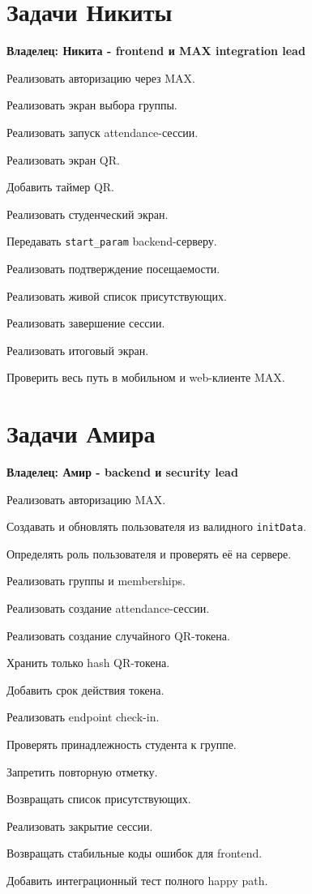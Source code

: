 \documentclass[11pt,a4paper]{article}
\newcommand{\code}[1]{\texttt{#1}}\newcommand{\owner}[1]{\textcolor{MaxPurple}{\textbf{Владелец: #1}}}
\begin{document}
\section{Задачи Никиты}
\owner{Никита - frontend и MAX integration lead}
\begin{tasklist}
  \item Реализовать авторизацию через MAX.
  \item Реализовать экран выбора группы.
  \item Реализовать запуск attendance-сессии.
  \item Реализовать экран QR.
  \item Добавить таймер QR.
  \item Реализовать студенческий экран.
  \item Передавать \code{start\_param} backend-серверу.
  \item Реализовать подтверждение посещаемости.
  \item Реализовать живой список присутствующих.
  \item Реализовать завершение сессии.
  \item Реализовать итоговый экран.
  \item Проверить весь путь в мобильном и web-клиенте MAX.
\end{tasklist}

\section{Задачи Амира}
\owner{Амир - backend и security lead}
\begin{tasklist}
  \item Реализовать авторизацию MAX.
  \item Создавать и обновлять пользователя из валидного \code{initData}.
  \item Определять роль пользователя и проверять её на сервере.
  \item Реализовать группы и memberships.
  \item Реализовать создание attendance-сессии.
  \item Реализовать создание случайного QR-токена.
  \item Хранить только hash QR-токена.
  \item Добавить срок действия токена.
  \item Реализовать endpoint check-in.
  \item Проверять принадлежность студента к группе.
  \item Запретить повторную отметку.
  \item Возвращать список присутствующих.
  \item Реализовать закрытие сессии.
  \item Возвращать стабильные коды ошибок для frontend.
  \item Добавить интеграционный тест полного happy path.
\end{tasklist}
\end{document}

